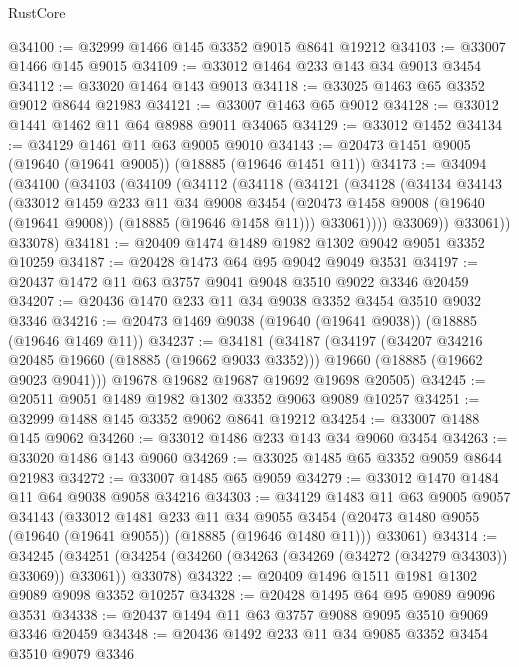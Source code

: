 \begin{lexlean}{RustCore}
\begin{coremodule}
@34100 := @32999 @1466 @145 @3352 @9015 @8641 @19212
@34103 := @33007 @1466 @145 @9015
@34109 := @33012 @1464 @233 @143 @34 @9013 @3454
@34112 := @33020 @1464 @143 @9013
@34118 := @33025 @1463 @65 @3352 @9012 @8644 @21983
@34121 := @33007 @1463 @65 @9012
@34128 := @33012 @1441 @1462 @11 @64 @8988 @9011 @34065
@34129 := @33012 @1452
@34134 := @34129 @1461 @11 @63 @9005 @9010
@34143 := @20473 @1451 @9005 (@19640 (@19641 @9005)) (@18885 (@19646 @1451 @11))
@34173 := @34094
    (@34100
      (@34103
        (@34109
          (@34112
            (@34118
              (@34121
                (@34128
                  (@34134
                    @34143
                    (@33012
                      @1459
                      @233
                      @11
                      @34
                      @9008
                      @3454
                      (@20473 @1458 @9008 (@19640 (@19641 @9008)) (@18885 (@19646 @1458 @11)))
                      @33061))))
              @33069))
          @33061))
      @33078)
@34181 := @20409 @1474 @1489 @1982 @1302 @9042 @9051 @3352 @10259
@34187 := @20428 @1473 @64 @95 @9042 @9049 @3531
@34197 := @20437 @1472 @11 @63 @3757 @9041 @9048 @3510 @9022 @3346 @20459
@34207 := @20436 @1470 @233 @11 @34 @9038 @3352 @3454 @3510 @9032 @3346
@34216 := @20473 @1469 @9038 (@19640 (@19641 @9038)) (@18885 (@19646 @1469 @11))
@34237 := @34181
    (@34187
      (@34197
        (@34207 @34216 @20485 @19660 (@18885 (@19662 @9033 @3352)))
        @19660
        (@18885 (@19662 @9023 @9041)))
      @19678
      @19682
      @19687
      @19692
      @19698
      @20505)
@34245 := @20511 @9051 @1489 @1982 @1302 @3352 @9063 @9089 @10257
@34251 := @32999 @1488 @145 @3352 @9062 @8641 @19212
@34254 := @33007 @1488 @145 @9062
@34260 := @33012 @1486 @233 @143 @34 @9060 @3454
@34263 := @33020 @1486 @143 @9060
@34269 := @33025 @1485 @65 @3352 @9059 @8644 @21983
@34272 := @33007 @1485 @65 @9059
@34279 := @33012 @1470 @1484 @11 @64 @9038 @9058 @34216
@34303 := @34129
    @1483
    @11
    @63
    @9005
    @9057
    @34143
    (@33012
      @1481
      @233
      @11
      @34
      @9055
      @3454
      (@20473 @1480 @9055 (@19640 (@19641 @9055)) (@18885 (@19646 @1480 @11)))
      @33061)
@34314 := @34245
    (@34251 (@34254 (@34260 (@34263 (@34269 (@34272 (@34279 @34303)) @33069)) @33061)) @33078)
@34322 := @20409 @1496 @1511 @1981 @1302 @9089 @9098 @3352 @10257
@34328 := @20428 @1495 @64 @95 @9089 @9096 @3531
@34338 := @20437 @1494 @11 @63 @3757 @9088 @9095 @3510 @9069 @3346 @20459
@34348 := @20436 @1492 @233 @11 @34 @9085 @3352 @3454 @3510 @9079 @3346

\end{coremodule}
\end{lexlean}
